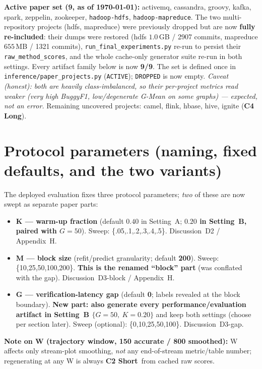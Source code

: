\documentclass[10pt]{article}
\providecommand{\code}[1]{\texttt{\small #1}}
\newcommand{\Ctwo}{\textcolor{blue!65!black}{\textbf{C2 Short}}}
\newcommand{\Cfour}{\textcolor{red!75!black}{\textbf{C4 Long}}}
\begin{document}
\noindent\textbf{Active paper set (9, as of \today):} activemq, cassandra, groovy,
kafka, spark, zeppelin, zookeeper, \code{hadoop-hdfs}, \code{hadoop-mapreduce}. The two
multi-repository projects (hdfs, mapreduce) were previously dropped but are now
\textbf{fully re-included}: their dumps were restored (hdfs $1.0$\,GB / 2907 commits,
mapreduce $655$\,MB / 1321 commits), \code{run\_final\_experiments.py} re-run to persist
their \code{raw\_method\_scores}, and the whole cache-only generator suite re-run in both
settings. Every artifact family below is now \textbf{9/9}. The set is defined once in
\code{inference/paper\_projects.py} (\code{ACTIVE}); \code{DROPPED} is now empty.
\emph{Caveat (honest): both are heavily class-imbalanced, so their per-project metrics
read weaker (very high BuggyF1, low/degenerate G-Mean on some graphs) --- expected, not
an error.} Remaining uncovered projects: camel, flink, hbase, hive, ignite (\Cfour).

\section*{Protocol parameters (naming, fixed defaults, and the two variants)}
The deployed evaluation fixes three protocol parameters; \emph{two} of these are now
swept as separate paper parts:
\begin{itemize}[leftmargin=1.5em,itemsep=1pt]
  \item \textbf{K --- warm-up fraction} (default $0.40$ in Setting~A; \textbf{$0.20$ in
  Setting~B, paired with $G\!=\!50$}). Sweep: \{.05,.1,.2,.3,.4,.5\}. Discussion~D2 /
  Appendix~H.
  \item \textbf{M --- block size} (refit/predict granularity; default \textbf{200}).
  Sweep: \{10,25,50,100,200\}. \textbf{This is the renamed ``block'' part} (was
  conflated with the gap). Discussion~D3-block / Appendix~H.
  \item \textbf{G --- verification-latency gap} (default \textbf{0}; labels revealed at
  the block boundary). \textbf{New part: also generate every performance/evaluation
  artifact in Setting~B $\{G\!=\!50,\ K\!=\!0.20\}$} and keep both settings (choose per
  section later). Sweep (optional): \{0,10,25,50,100\}. Discussion~D3-gap.
\end{itemize}
\textbf{Note on W (trajectory window, 150 accurate / 800 smoothed):} W affects only
stream-plot smoothing, \emph{not} any end-of-stream metric/table number; regenerating
at any W is always \Ctwo\ from cached raw scores.
\end{document}
